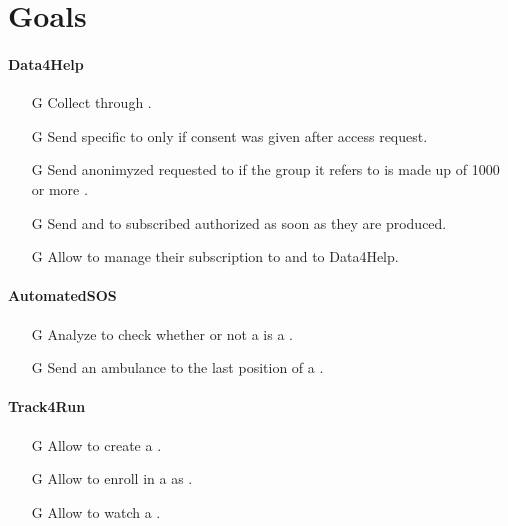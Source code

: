 \documentclass[../../rasd.tex]{subfiles}
\begin{document}
\section{Goals}

\paragraph{Data4Help}
\begin{itemize}
	
	\item[G\subs{1}]Collect  through .
	
	\item[G\subs{2}]Send specific  to  only if  consent was given after access request.
	\item[G\subs{3}]Send anonimyzed requested  to  if the group it refers to is made up of 1000 or more .

	\item[G\subs{4}]Send  and  to subscribed authorized  as soon as they are produced.
	
	\item[G\subs{5}]Allow  to manage their subscription to  and to Data4Help.		
	
\end{itemize}

\paragraph{AutomatedSOS}
\begin{itemize}
	\item[G\subs{6}]Analyze  to check whether or not a  is a .
	\item[G\subs{7}]Send an ambulance to the last position of a .
\end{itemize}

\paragraph{Track4Run}
\begin{itemize}
	\item[G\subs{8}]Allow  to create a .
	\item[G\subs{9}]Allow  to enroll in a  as . 
	\item[G\subs{10}]Allow  to watch a .
\end{itemize}
\end{document}
